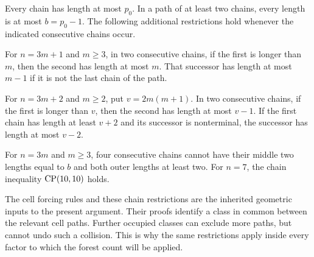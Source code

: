 \begin{lemma}
\label{lem:inherited-chains}
Every chain has length at most $p_0$. In a path of at least two chains,
every length is at most $b=p_0-1$. The following additional restrictions
hold whenever the indicated consecutive chains occur.

For $n=3m+1$ and $m\ge3$, in two consecutive chains, if the first is longer than $m$, then the
second has length at most $m$. That successor has length at most $m-1$ if it is
not the last chain of the path.

For $n=3m+2$ and $m\ge2$, put $v=2m(m+1)$. In two consecutive chains, if the first is longer than $v$, then the
second has length at most $v-1$. If the first chain has length
at least $v+2$ and its successor is nonterminal, the successor has
length at most $v-2$.

For $n=3m$ and $m\ge3$, four consecutive chains cannot have their
middle two lengths equal to $b$ and both outer lengths at least two.
For $n=7$, the chain inequality $\operatorname{CP}(10,10)$ holds.
\end{lemma}

The cell forcing rules and these chain restrictions are the inherited
geometric inputs to the present argument. Their proofs identify a class
in common between the relevant cell paths. Further occupied classes can
exclude more paths, but cannot undo such a collision. This is why the
same restrictions apply inside every factor to which the forest count
will be applied.
